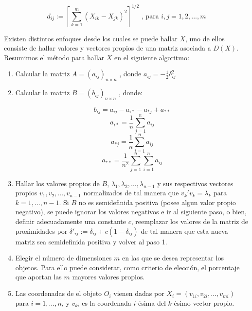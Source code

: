 \documentclass[12pt,oneside]{book}\usepackage[]{graphicx}\usepackage[]{color}
\theoremstyle{definition} %
\begin{document}
$$ d_{ij}:=\left[\displaystyle \sum_{k=1}^m (X_{ik}-X_{jk})^2 \right]^{1/2} \text{ , para } i,j=1,2,...,m$$


Existen distintos enfoques desde los cuales se puede hallar $X$, uno de ellos consiste de hallar valores y vectores propios de una matriz asociada a $D(X)$. Resumimos el método para hallar $X$ en el siguiente algoritmo:

\begin{enumerate}

\item Calcular la matriz $A=(a_{ij})_{n\times n}$ , donde $a_{ij} = -\frac{1}{2}\delta_{ij}^2$
\item Calcular la matriz $B = (b_{ij})_{n\times n}$ , donde: 

$$b_{ij} = a_{ij} -a_{i*}-a_{*j} + a_{**} $$
$$a_{i*} = \frac{1}{n} \sum_{j=1}^n a_{ij}  $$
$$a_{*j} = \frac{1}{n} \sum_{i=1}^n a_{ij}  $$
$$a_{**} = \frac{1}{n^2} \sum_{j=1}^n  \sum_{i=1}^n  a_{ij}  $$

\item Hallar los valores propios de $B$, $\lambda_1, \lambda_2, \dots , \lambda_{n-1}$ y sus respectivos vectores propios $v_1, v_2, \dots, v_{n-1}$ normalizados de tal manera que $v_k' v_k = \lambda_k$ para $k=1,\dots,n-1$. Si $B$ no es semidefinida positiva (posee algun valor propio negativo), se puede ignorar los valores negativos e ir al siguiente paso, o bien, definir adecuadamente una constante $c$, reemplazar los valores de la matriz de proximidades por $\delta'_{ij} := \delta_{ij} + c(1-\delta_{ij}) $ de tal manera que esta nueva matriz sea semidefinida positiva y volver al paso 1.

\item Elegir el número de dimensiones $m$ en las que se desea representar los objetos. Para ello puede considerar, como criterio de elección, el porcentaje que aportan las $m$ mayores valores propios.

\item Las coordenadas de el objeto $O_i$ vienen dadas por $X_i = (v_{1i}, v_{2i},\dots, v_{mi})$ para $i=1,\dots,n$, y $v_{ki}$ es la coordenada $i$-ésima del $k$-ésimo vector propio.

\end{enumerate}
\end{document}

